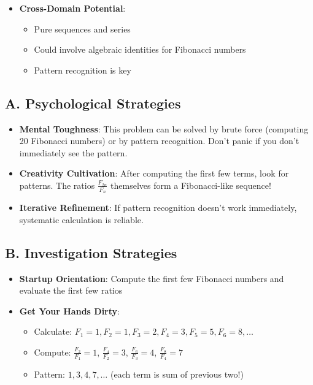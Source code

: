 \documentclass[12pt]{article}
\begin{document}
\begin{problemconfigbox}
\begin{itemize}[leftmargin=*]
    \item \textbf{Cross-Domain Potential}: 
    \begin{itemize}
        \item Pure sequences and series
        \item Could involve algebraic identities for Fibonacci numbers
        \item Pattern recognition is key
    \end{itemize}
\end{itemize}
\end{problemconfigbox}

\begin{strategicbox}
\subsection*{A. Psychological Strategies}
\begin{itemize}[leftmargin=*]
    \item \textbf{Mental Toughness}: This problem can be solved by brute force (computing 20 Fibonacci numbers) or by pattern recognition. Don't panic if you don't immediately see the pattern.
    
    \item \textbf{Creativity Cultivation}: After computing the first few terms, look for patterns. The ratios $\frac{F_{2n}}{F_n}$ themselves form a Fibonacci-like sequence!
    
    \item \textbf{Iterative Refinement}: If pattern recognition doesn't work immediately, systematic calculation is reliable.
\end{itemize}

\subsection*{B. Investigation Strategies}
\begin{itemize}[leftmargin=*]
    \item \textbf{Startup Orientation}: Compute the first few Fibonacci numbers and evaluate the first few ratios
    
    \item \textbf{Get Your Hands Dirty}: 
    \begin{itemize}
        \item Calculate: $F_1=1, F_2=1, F_3=2, F_4=3, F_5=5, F_6=8, \ldots$
        \item Compute: $\frac{F_2}{F_1} = 1$, $\frac{F_4}{F_2} = 3$, $\frac{F_6}{F_3} = 4$, $\frac{F_8}{F_4} = 7$
        \item Pattern: $1, 3, 4, 7, \ldots$ (each term is sum of previous two!)
    \end{itemize}
    

\end{itemize}
\end{strategicbox}
\end{document}
